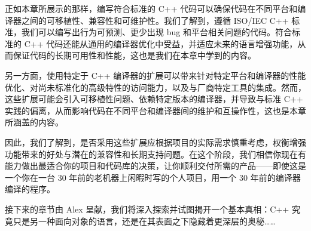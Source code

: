正如本章所展示的那样，编写符合标准的 C++ 代码可以确保代码在不同平台和编译器之间的可移植性、兼容性和可维护性。我们了解到，遵循 ISO/IEC C++ 标准，我们可以编写出行为可预测、更少出现 bug 和平台相关问题的代码。符合标准的 C++ 代码还能从通用的编译器优化中受益，并适应未来的语言增强功能，从而保证代码的长期可用性和性能，这也是我们在本章中学到的内容。

另一方面，使用特定于 C++ 编译器的扩展可以带来针对特定平台和编译器的性能优化、对尚未标准化的高级特性的访问能力，以及与厂商特定工具的集成。然而，这些扩展可能会引入可移植性问题、依赖特定版本的编译器，并导致与标准 C++ 实践的偏离，从而影响代码在不同平台和编译器间的维护和互操作性，这也是本章所涵盖的内容。

因此，我们了解到，是否采用这些扩展应根据项目的实际需求慎重考虑，权衡增强功能带来的好处与潜在的兼容性和长期支持问题。在这个阶段，我们相信你现在有能力做出最适合你的项目和代码库的决策，让你顺利交付所需的产品——即使这是一个你在一台 30 年前的老机器上闲暇时写的个人项目，用一个 30 年前的编译器编译的程序。

接下来的章节由 Alex 呈献，我们将深入探索并试图揭开一个基本真相：C++ 究竟只是另一种面向对象的语言，还是在其表面之下隐藏着更深层的奥秘……